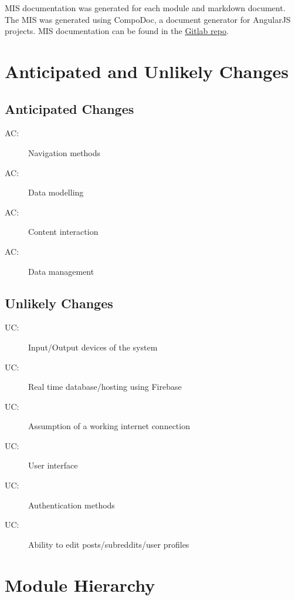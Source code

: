 \documentclass[12pt,fleqn]{article}
\newcounter{acnum}
\newcommand{\actheacnum}{AC\theacnum}
\newcounter{ucnum}
\newcommand{\uctheucnum}{UC\theucnum}
\begin{document}
MIS documentation was generated for each module and markdown document.  The MIS was generated using CompoDoc, a document generator for AngularJS projects.  MIS documentation can be found in the \href{https://gitlab.cas.mcmaster.ca/trudeaua/reddit-clone/tree/master/Documentation/MIS}{Gitlab repo}.

\section{Anticipated and Unlikely Changes} \label{sec:changes}
\subsection{Anticipated Changes} \label{subsec:anticipated}
\begin{description}
\item[ \actheacnum:] Navigation methods
\item[ \actheacnum:] Data modelling
\item[ \actheacnum:] Content interaction
\item[ \actheacnum:] Data management
\end{description}

\subsection{Unlikely Changes} \label{SecUchange}
\begin{description}
\item[ \uctheucnum:] Input/Output devices of the system
\item[ \uctheucnum:] Real time database/hosting using Firebase
\item[ \uctheucnum:] Assumption of a working internet connection
\item[ \uctheucnum:] User interface
\item[ \uctheucnum:] Authentication methods
\item[ \uctheucnum:] Ability to edit posts/subreddits/user profiles
\end{description}

\section{Module Hierarchy} \label{sec:hierarchy}
\end{document}
